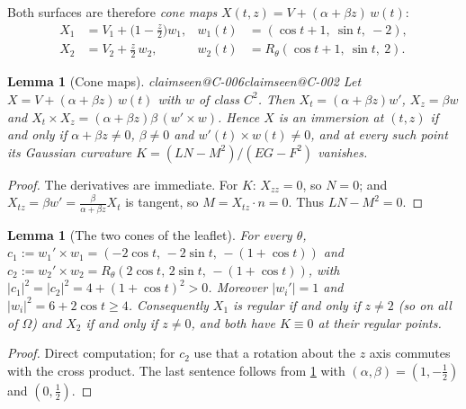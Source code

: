 \documentclass[11pt,a4paper]{article}
\makeatletter
\theoremstyle{plain}
\newtheorem{lemma}[theorem]{Lemma}
\theoremstyle{remark}
\newcommand{\claim}[1]{\ifcsname claimseen@#1\endcsname\else\expandafter\gdef\csname claimseen@#1\endcsname{}\label{claim:#1}\fi}
\makeatother
\begin{document}
Both surfaces are therefore \emph{cone maps} $X(t,z)=V+(\alpha+\beta z)\,w(t)$:
\begin{equation}\label{eq:conemaps}
\begin{aligned}
X_1&=V_1+\big(1-\tfrac z2\big)w_1, & w_1(t)&=(\cos t+1,\ \sin t,\ -2),\\
X_2&=V_2+\tfrac z2\,w_2, & w_2(t)&=R_\theta(\cos t+1,\ \sin t,\ 2).
\end{aligned}
\end{equation}

\begin{lemma}[Cone maps]\label{lem:conemap}\claim{C-006}\claim{C-002}
Let $X=V+(\alpha+\beta z)\,w(t)$ with $w$ of class $C^2$. Then $X_t=(\alpha+\beta z)w'$, $X_z=\beta w$ and
$X_t\times X_z=(\alpha+\beta z)\beta\,(w'\times w)$. Hence $X$ is an immersion at $(t,z)$ if and only if $\alpha+\beta z\ne0$,
$\beta\ne0$ and $w'(t)\times w(t)\ne0$, and at every such point its Gaussian curvature $K=(LN-M^2)/(EG-F^2)$ vanishes.
\end{lemma}
\begin{proof}
The derivatives are immediate. For $K$: $X_{zz}=0$, so $N=0$; and $X_{tz}=\beta w'=\tfrac{\beta}{\alpha+\beta z}X_t$ is
tangent, so $M=X_{tz}\cdot n=0$. Thus $LN-M^2=0$.
\end{proof}

\begin{lemma}[The two cones of the leaflet]\label{lem:leafcones}
For every $\theta$, $c_1:=w_1'\times w_1=(-2\cos t,\,-2\sin t,\,-(1+\cos t))$ and
$c_2:=w_2'\times w_2=R_\theta(2\cos t,\,2\sin t,\,-(1+\cos t))$, with $|c_1|^2=|c_2|^2=4+(1+\cos t)^2>0$. Moreover
$|w_i'|=1$ and $|w_i|^2=6+2\cos t\ge4$. Consequently $X_1$ is regular if and only if $z\ne2$ (so on all of $\Omega$) and
$X_2$ if and only if $z\ne0$, and both have $K\equiv0$ at their regular points.
\end{lemma}
\begin{proof}
Direct computation; for $c_2$ use that a rotation about the $z$ axis commutes with the cross product. The last sentence
follows from \cref{lem:conemap} with $(\alpha,\beta)=(1,-\frac12)$ and $(0,\frac12)$.
\end{proof}
\end{document}

